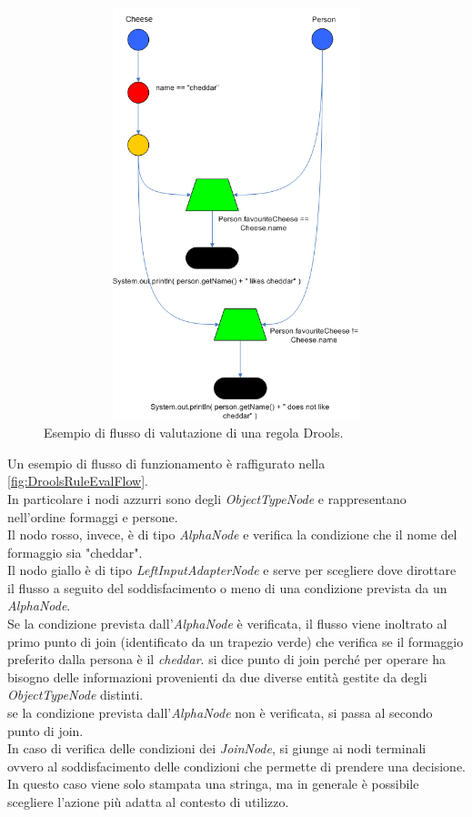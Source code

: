 	
 	\begin{figure}[H]
 		\begin{center}
 			\includegraphics[width=12cm,height=12cm,keepaspectratio]{Pics/drools_rule_flow_example.png}
 			\caption{Esempio di flusso di valutazione di una regola Drools.}
 			\label{fig:DroolsRuleEvalFlow}
 		\end{center}
 	\end{figure}
 	
 	Un esempio di flusso di funzionamento è raffigurato nella \autoref{fig:DroolsRuleEvalFlow}. \\
 	In particolare i nodi azzurri sono degli \textit{ObjectTypeNode} e rappresentano nell'ordine formaggi e persone. \\
 	Il nodo rosso, invece, è di tipo \textit{AlphaNode} e verifica la condizione che il nome del formaggio sia "cheddar". \\
 	Il nodo giallo è di tipo \textit{LeftInputAdapterNode} e serve per scegliere dove dirottare il flusso a seguito del soddisfacimento o meno di una condizione prevista da un \textit{AlphaNode}.\\
 	Se la condizione prevista dall'\textit{AlphaNode} è verificata, il flusso viene inoltrato al primo punto di join (identificato da un trapezio verde) che verifica se il formaggio preferito dalla persona è il \textit{cheddar}. si dice punto di join perché per operare ha bisogno delle informazioni provenienti da due diverse entità gestite da degli \textit{ObjectTypeNode} distinti. \\ se la condizione prevista dall'\textit{AlphaNode} non è verificata, si passa al secondo punto di join.\\
 	In caso di verifica delle condizioni dei \textit{JoinNode}, si giunge ai nodi terminali ovvero al soddisfacimento delle condizioni che permette di prendere una decisione. In questo caso viene solo stampata una stringa, ma in generale è possibile scegliere l'azione più adatta al contesto di utilizzo.

